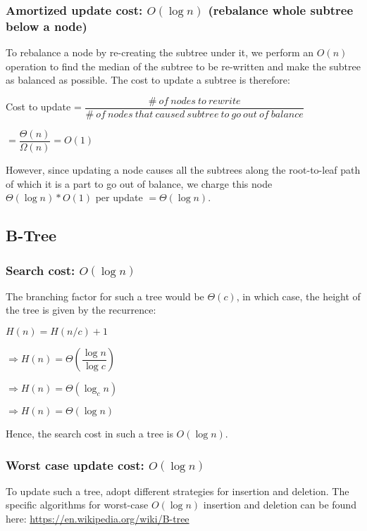 \documentclass{article}
\begin{document}
\subsubsection{Amortized update cost: $O(\log{n})$ (rebalance whole subtree below a node)}

To rebalance a node by re-creating the subtree under it, we perform an
$O(n)$ operation to find the median of the subtree to be re-written
and make the subtree as balanced as possible. The cost to update a
subtree is therefore:

Cost to update =
$\dfrac{\#\ of\ nodes\ to\ rewrite}{\#\ of\ nodes\ that\ caused\ subtree\ to\ go\ out\ of\ balance}$

$=\dfrac{\Theta(n)}{\Omega(n)} = O(1)$

However, since updating a node causes all the subtrees along the
root-to-leaf path of which it is a part to go out of balance, we
charge this node $\Theta(\log{n}) * O(1)$ per update
$=\Theta(\log{n})$.

\clearpage

\subsection{B-Tree}

\subsubsection{Search cost: $O(\log{n})$}

The branching factor for such a tree would be $\Theta(c)$, in which
case, the height of the tree is given by the recurrence:

$H(n) = H(n/c) + 1$

$\Rightarrow H(n) = \Theta\left(\dfrac{\log{n}}{\log{c}}\right)$

$\Rightarrow H(n) = \Theta(\log_c{n})$

$\Rightarrow H(n) = \Theta(\log{n})$

Hence, the search cost in such a tree is $O(\log{n})$.

\subsubsection{Worst case update cost: $O(\log{n})$}

To update such a tree, adopt different strategies for insertion and
deletion. The specific algorithms for worst-case $O(\log{n})$
insertion and deletion can be found here:
\url{https://en.wikipedia.org/wiki/B-tree}
\end{document}
